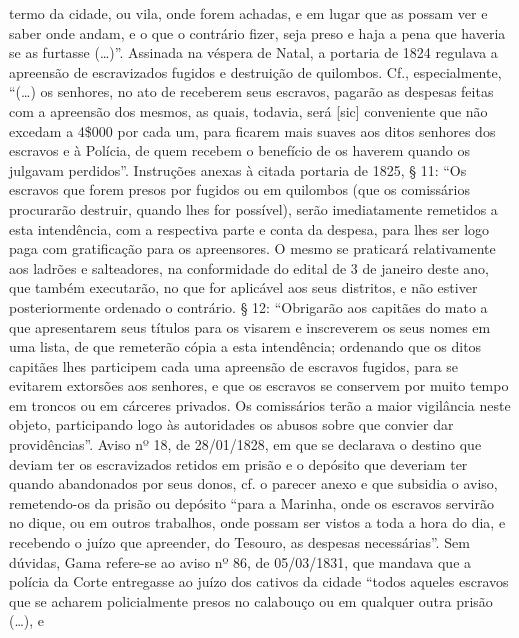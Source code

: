 {{  termo da cidade, ou vila, onde forem achadas, e em lugar que as possam
  ver e saber onde andam, e o que o contrário fizer, seja preso e haja a
  pena que haveria se as furtasse (\ldots{})''. Assinada na véspera de Natal,
  a portaria de 1824 regulava a apreensão de escravizados fugidos e
  destruição de quilombos. Cf., especialmente, ``(\ldots{}) os senhores, no ato
  de receberem seus escravos, pagarão as despesas feitas com a apreensão
  dos mesmos, as quais, todavia, será {[}sic{]} conveniente que não
  excedam a 4\$000 por cada um, para ficarem mais suaves aos ditos
  senhores dos escravos e à Polícia, de quem recebem o benefício de os
  haverem quando os julgavam perdidos''. Instruções anexas à citada
  portaria de 1825, § 11: ``Os escravos que forem presos por fugidos ou
  em quilombos (que os comissários procurarão destruir, quando lhes for
  possível), serão imediatamente remetidos a esta intendência, com a
  respectiva parte e conta da despesa, para lhes ser logo paga com
  gratificação para os apreensores. O mesmo se praticará relativamente
  aos ladrões e salteadores, na conformidade do edital de 3 de janeiro
  deste ano, que também executarão, no que for aplicável aos seus
  distritos, e não estiver posteriormente ordenado o contrário. § 12:
  ``Obrigarão aos capitães do mato a que apresentarem seus títulos para
  os visarem e inscreverem os seus nomes em uma lista, de que remeterão
  cópia a esta intendência; ordenando que os ditos capitães lhes
  participem cada uma apreensão de escravos fugidos, para se evitarem
  extorsões aos senhores, e que os escravos se conservem por muito tempo
  em troncos ou em cárceres privados. Os comissários terão a maior
  vigilância neste objeto, participando logo às autoridades os abusos
  sobre que convier dar providências''. Aviso nº 18, de 28/01/1828, em
  que se declarava o destino que deviam ter os escravizados retidos em
  prisão e o depósito que deveriam ter quando abandonados por seus
  donos, cf. o parecer anexo e que subsidia o aviso, remetendo-os da
  prisão ou depósito ``para a Marinha, onde os escravos servirão no
  dique, ou em outros trabalhos, onde possam ser vistos a toda a hora do
  dia, e recebendo o juízo que apreender, do Tesouro, as despesas
  necessárias''. Sem dúvidas, Gama refere-se ao aviso nº 86, de
  05/03/1831, que mandava que a polícia da Corte entregasse ao juízo dos
  cativos da cidade ``todos aqueles escravos que se acharem
  policialmente presos no calabouço ou em qualquer outra prisão (\ldots{}), e
}}
